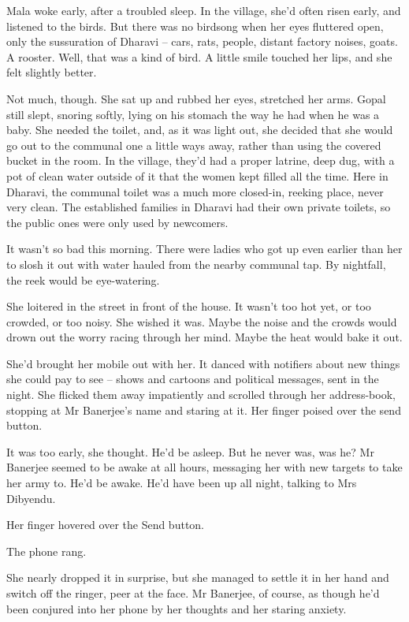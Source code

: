 Mala woke early, after a troubled sleep. In the village, she'd
often risen early, and listened to the birds. But there was no
birdsong when her eyes fluttered open, only the sussuration of
Dharavi -- cars, rats, people, distant factory noises, goats. A
rooster. Well, that was a kind of bird. A little smile touched her
lips, and she felt slightly better.

Not much, though. She sat up and rubbed her eyes, stretched her
arms. Gopal still slept, snoring softly, lying on his stomach the
way he had when he was a baby. She needed the toilet, and, as it
was light out, she decided that she would go out to the communal
one a little ways away, rather than using the covered bucket in the
room. In the village, they'd had a proper latrine, deep dug, with a
pot of clean water outside of it that the women kept filled all the
time. Here in Dharavi, the communal toilet was a much more
closed-in, reeking place, never very clean. The established
families in Dharavi had their own private toilets, so the public
ones were only used by newcomers.

It wasn't so bad this morning. There were ladies who got up even
earlier than her to slosh it out with water hauled from the nearby
communal tap. By nightfall, the reek would be eye-watering.

She loitered in the street in front of the house. It wasn't too hot
yet, or too crowded, or too noisy. She wished it was. Maybe the
noise and the crowds would drown out the worry racing through her
mind. Maybe the heat would bake it out.

She'd brought her mobile out with her. It danced with notifiers
about new things she could pay to see -- shows and cartoons and
political messages, sent in the night. She flicked them away
impatiently and scrolled through her address-book, stopping at Mr
Banerjee's name and staring at it. Her finger poised over the send
button.

It was too early, she thought. He'd be asleep. But he never was,
was he? Mr Banerjee seemed to be awake at all hours, messaging her
with new targets to take her army to. He'd be awake. He'd have been
up all night, talking to Mrs Dibyendu.

Her finger hovered over the Send button.

The phone rang.

She nearly dropped it in surprise, but she managed to settle it in
her hand and switch off the ringer, peer at the face. Mr Banerjee,
of course, as though he'd been conjured into her phone by her
thoughts and her staring anxiety.

